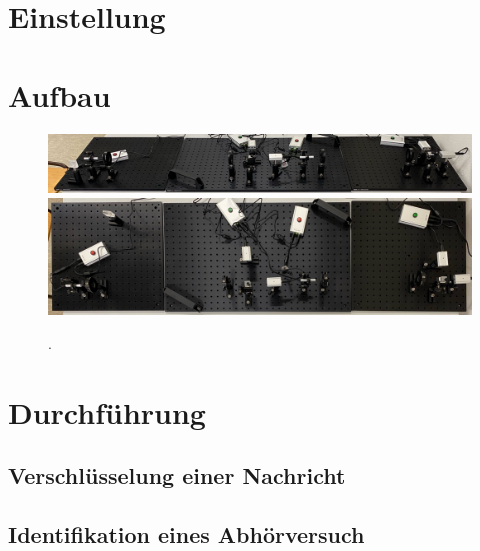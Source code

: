 \newpage

\cite{krypt}

\section{Einstellung}

\section{Aufbau}

\begin{figure}[H]
	\centering
	\includegraphics[width=\textwidth]{content/aufbau/front.jpg}\\[1ex]
	\includegraphics[width=\textwidth]{content/aufbau/drauf.jpg}
	\caption{.}
	\label{fig:aufbau}
\end{figure}

\section{Durchführung}

\subsection{Verschlüsselung einer Nachricht}

\subsection{Identifikation eines Abhörversuch}
